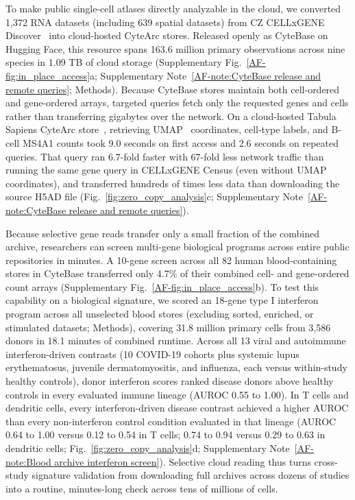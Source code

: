 \documentclass[11pt]{article}
\newcommand{\sref}[1]{\ref*{AF-#1}}
\begin{document}
To make public single-cell atlases directly analyzable in the cloud, we converted 1,372 RNA datasets (including 639 spatial datasets) from CZ CELLxGENE Discover~\cite{cellxgene2025} into cloud-hosted CyteArc stores. Released openly as CyteBase on Hugging Face, this resource spans 163.6 million primary observations across nine species in 1.09 TB of cloud storage (Supplementary Fig.~\sref{fig:in_place_access}a; Supplementary Note~\sref{note:CyteBase release and remote queries}; Methods). Because CyteBase stores maintain both cell-ordered and gene-ordered arrays, targeted queries fetch only the requested genes and cells rather than transferring gigabytes over the network. On a cloud-hosted Tabula Sapiens CyteArc store~\cite{tabulasapiens2022,tabulasapiens2024}, retrieving UMAP~\cite{mcinnes2018umap} coordinates, cell-type labels, and B-cell MS4A1 counts took 9.0 seconds on first access and 2.6 seconds on repeated queries. That query ran 6.7-fold faster with 67-fold less network traffic than running the same gene query in CELLxGENE Census (even without UMAP coordinates), and transferred hundreds of times less data than downloading the source H5AD file (Fig.~\ref{fig:zero_copy_analysis}c; Supplementary Note~\sref{note:CyteBase release and remote queries}).

Because selective gene reads transfer only a small fraction of the combined archive, researchers can screen multi-gene biological programs across entire public repositories in minutes. A 10-gene screen across all 82 human blood-containing stores in CyteBase transferred only 4.7\% of their combined cell- and gene-ordered count arrays (Supplementary Fig.~\sref{fig:in_place_access}b). To test this capability on a biological signature, we scored an 18-gene type I interferon program across all unselected blood stores (excluding sorted, enriched, or stimulated datasets; Methods), covering 31.8 million primary cells from 3,586 donors in 18.1 minutes of combined runtime. Across all 13 viral and autoimmune interferon-driven contrasts (10 COVID-19 cohorts plus systemic lupus erythematosus, juvenile dermatomyositis, and influenza, each versus within-study healthy controls), donor interferon scores ranked disease donors above healthy controls in every evaluated immune lineage (AUROC 0.55 to 1.00). In T cells and dendritic cells, every interferon-driven disease contrast achieved a higher AUROC than every non-interferon control condition evaluated in that lineage (AUROC 0.64 to 1.00 versus 0.12 to 0.54 in T cells; 0.74 to 0.94 versus 0.29 to 0.63 in dendritic cells; Fig.~\ref{fig:zero_copy_analysis}d; Supplementary Note~\sref{note:Blood archive interferon screen}). Selective cloud reading thus turns cross-study signature validation from downloading full archives across dozens of studies into a routine, minutes-long check across tens of millions of cells.
\end{document}

